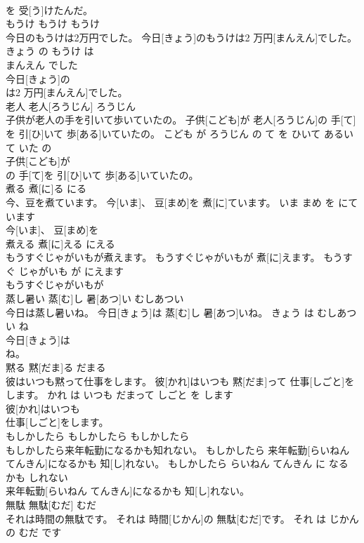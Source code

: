 \documentclass[8pt]{extreport}
\begin{document}
\begin{CJK}{UTF8}{min}
\\	を 受[う]けたんだ。			
\\	もうけ	もうけ	もうけ	
\\	今日のもうけは2万円でした。	今日[きょう]のもうけは2 万円[まんえん]でした。	きょう の もうけ は 
\\	まんえん でした	
\\	今日[きょう]の
\\	は2 万円[まんえん]でした。			
\\	老人	老人[ろうじん]	ろうじん	
\\	子供が老人の手を引いて歩いていたの。	子供[こども]が 老人[ろうじん]の 手[て]を 引[ひ]いて 歩[ある]いていたの。	こども が ろうじん の て を ひいて あるいて いた の	
\\	子供[こども]が
\\	の 手[て]を 引[ひ]いて 歩[ある]いていたの。			
\\	煮る	煮[に]る	にる	
\\	今、豆を煮ています。	今[いま]、 豆[まめ]を 煮[に]ています。	いま まめ を にて います	
\\	今[いま]、 豆[まめ]を
\\	煮える	煮[に]える	にえる	
\\	もうすぐじゃがいもが煮えます。	もうすぐじゃがいもが 煮[に]えます。	もうすぐ じゃがいも が にえます	
\\	もうすぐじゃがいもが
\\	蒸し暑い	蒸[む]し 暑[あつ]い	むしあつい	
\\	今日は蒸し暑いね。	今日[きょう]は 蒸[む]し 暑[あつ]いね。	きょう は むしあつい ね	
\\	今日[きょう]は
\\	ね。			
\\	黙る	黙[だま]る	だまる	
\\	彼はいつも黙って仕事をします。	彼[かれ]はいつも 黙[だま]って 仕事[しごと]をします。	かれ は いつも だまって しごと を します	
\\	彼[かれ]はいつも
\\	仕事[しごと]をします。			
\\	もしかしたら	もしかしたら	もしかしたら	
\\	もしかしたら来年転勤になるかも知れない。	もしかしたら 来年転勤[らいねん てんきん]になるかも 知[し]れない。	もしかしたら らいねん てんきん に なる かも しれない	
\\	来年転勤[らいねん てんきん]になるかも 知[し]れない。			
\\	無駄	無駄[むだ]	むだ	
\\	それは時間の無駄です。	それは 時間[じかん]の 無駄[むだ]です。	それ は じかん の むだ です	

\end{CJK}
\end{document}
